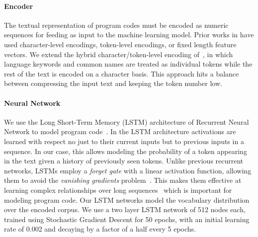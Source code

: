 \paragraph{Encoder} The textual representation of program codes must be encoded as numeric sequences for feeding as input to the machine learning model. Prior works in have used character-level encodings, token-level encodings, or fixed length feature vectors. We extend the hybrid character/token-level encoding of~\cite{Cummins2017b}, in which language keywords and common names are treated as individual tokens while the rest of the text is encoded on a character basis. This approach hits a balance between compressing the input text and keeping the token number low. 

\paragraph{Neural Network} We use the Long Short-Term Memory (LSTM) architecture of Recurrent Neural Network to model program code~\cite{Hochreiter1997}. In the LSTM architecture activations are learned with respect no just to their current inputs but to previous inputs in a sequence. In our case, this allows modeling the probability of a token appearing in the text given a history of previously seen tokens. Unlike previous recurrent networks, LSTMs employ a \emph{forget gate} with a linear activation function, allowing them to avoid the \emph{vanishing gradients} problem~\cite{Pacanu2013}. This makes them effective at learning complex relationships over long sequences~\cite{Lipton2015} which is important for modeling program code. Our LSTM networks model the vocabulary distribution over the encoded corpus. We use a two layer LSTM network of 512 nodes each, trained using Stochastic Gradient Descent for 50 epochs, with an initial learning rate of 0.002 and decaying by a factor of a half every 5 epochs.


